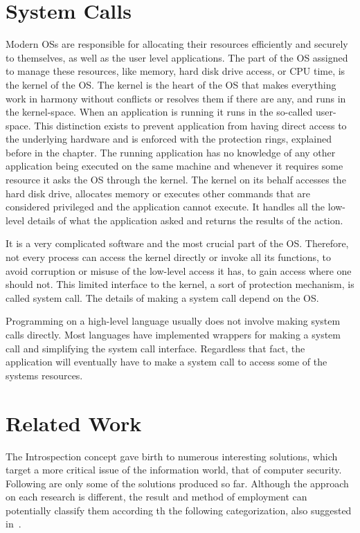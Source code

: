 \section{System Calls}\label{sec:syscalls}
Modern  \ac{OS}s are responsible for allocating their resources efficiently and securely to themselves, as well as the user level applications. The part of the \ac{OS} assigned to manage these resources, like memory, hard disk drive access, or \ac{CPU} time, is the kernel of the \ac{OS}. The kernel is the heart of the \ac{OS} that makes everything work in harmony without conflicts or resolves them if there are any, and runs in the kernel-space. When an application is running it runs in the so-called user-space. This distinction exists to prevent application from having direct access to the underlying hardware and is enforced with the protection rings, explained before in the chapter. The running application has no knowledge of any other application being executed on the same machine and whenever it requires some resource it asks the \ac{OS} through the kernel. The kernel on its behalf accesses the hard disk drive, allocates memory or executes other commands that are considered privileged and the application cannot execute. It handles all the low-level details of what the application asked and returns the results of the action. 

\par It is a very complicated software and the most crucial part of the \ac{OS}. Therefore, not every process can access the kernel directly or invoke all its functions, to avoid corruption or misuse of the low-level access it has, to gain access where one should not. This limited interface to the kernel, a sort of protection mechanism, is called system call. The details of making a system call depend on the \ac{OS}.

\par Programming on a high-level language usually does not involve making system calls directly. Most languages have implemented wrappers for making a system call and simplifying the system call interface. Regardless that fact, the application will eventually have to make a system call to access some of the systems resources.


\section{Related Work}\label{sec:related}
The Introspection concept gave birth to numerous interesting solutions, which target a more critical issue of the information world, that of computer security. Following are only some of the solutions produced so far. Although the approach on each research is different, the result and method of employment can potentially classify them according th the following categorization, also suggested in~\cite{bauman2015survey}.

